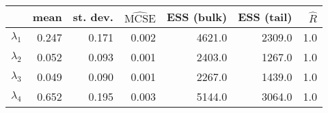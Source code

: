\begin{tabular}{lrrrrrr}
\toprule
{} &   mean &  st. dev. &  $\widehat{\mathrm{MCSE}}$ &  ESS (bulk) &  ESS (tail) &  $\widehat{R}$ \\
\midrule
$\lambda_1$ &  0.247 &     0.171 &                      0.002 &      4621.0 &      2309.0 &            1.0 \\
$\lambda_2$ &  0.052 &     0.093 &                      0.001 &      2403.0 &      1267.0 &            1.0 \\
$\lambda_3$ &  0.049 &     0.090 &                      0.001 &      2267.0 &      1439.0 &            1.0 \\
$\lambda_4$ &  0.652 &     0.195 &                      0.003 &      5144.0 &      3064.0 &            1.0 \\
\bottomrule
\end{tabular}
